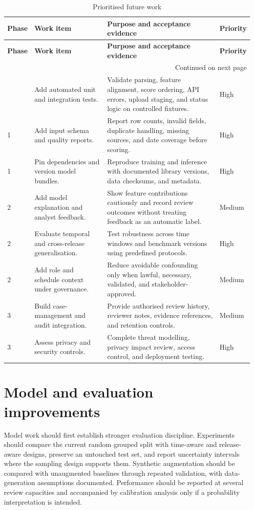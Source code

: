 \documentclass[12pt,a4paper,oneside]{report}
\begin{document}
\begin{longtable}{|p{}|p{}|p{}|p{}|}
\caption{Prioritised future work}\label{tab:future-work}\\
\hline
\textbf{Phase} & \textbf{Work item} & \textbf{Purpose and acceptance evidence} & \textbf{Priority}\\\hline
\endfirsthead
\hline
\textbf{Phase} & \textbf{Work item} & \textbf{Purpose and acceptance evidence} & \textbf{Priority}\\\hline
\endhead
\hline
\multicolumn{4}{r}{Continued on next page}\\
\endfoot
\hline
\endlastfoot
1 & Add automated unit and integration tests. & Validate parsing, feature alignment, score ordering, API errors, upload staging, and status logic on controlled fixtures. & High\\\hline
1 & Add input schema and quality reports. & Report row counts, invalid fields, duplicate handling, missing sources, and date coverage before scoring. & High\\\hline
1 & Pin dependencies and version model bundles. & Reproduce training and inference with documented library versions, data checksums, and metadata. & High\\\hline
2 & Add model explanation and analyst feedback. & Show feature contributions cautiously and record review outcomes without treating feedback as an automatic label. & Medium\\\hline
2 & Evaluate temporal and cross-release generalisation. & Test robustness across time windows and benchmark versions using predefined protocols. & High\\\hline
2 & Add role and schedule context under governance. & Reduce avoidable confounding only when lawful, necessary, validated, and stakeholder-approved. & Medium\\\hline
3 & Build case-management and audit integration. & Provide authorised review history, reviewer notes, evidence references, and retention controls. & Medium\\\hline
3 & Assess privacy and security controls. & Complete threat modelling, privacy impact review, access control, and deployment testing. & High\\\hline
\end{longtable}

\section{Model and evaluation improvements}
Model work should first establish stronger evaluation discipline.
Experiments should compare the current random grouped split with
time-aware and release-aware designs, preserve an untouched test set,
and report uncertainty intervals where the sampling design supports
them. Synthetic augmentation should be compared with unaugmented
baselines through repeated validation, with data-generation
assumptions documented. Performance should be reported at several
review capacities and accompanied by calibration analysis only if a
probability interpretation is intended.
\end{document}
